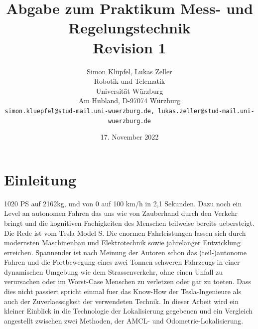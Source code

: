 \documentclass[11pt,a4paper]{article}
\begin{document}
\noindent

\title{\Large \bf Abgabe zum Praktikum Mess- und Regelungstechnik \\ \textbf{Revision 1}}

\author{Simon Klüpfel, Lukas Zeller\\
  Robotik und Telematik \\
  Universität Würzburg\\
  Am Hubland, D-97074 Würzburg\\
{\small \texttt{simon.kluepfel@stud-mail.uni-wuerzburg.de, lukas.zeller@stud-mail.uni-wuerzburg.de}}
}
\date{17. November 2022}

\maketitle

\section{Einleitung}
1020 PS auf 2162kg, und von 0 auf 100 km/h in 2,1 Sekunden\cite{website:tesla}. Dazu noch ein Level an autonomen Fahren das uns wie von Zauberhand durch den Verkehr bringt
und die kognitiven Faehigkeiten des Menschen teilweise bereits uebersteigt. Die Rede ist vom Tesla Model S. Die enormen Fahrleistungen lassen sich durch modernsten Maschinenbau und Elektrotechnik 
sowie jahrelanger Entwicklung erreichen. Spannender ist nach Meinung der Autoren schon das (teil-)autonome Fahren und die Fortbewegung eines 
zwei Tonnen schweren Fahrzeugs in einer dynamischen Umgebung wie dem Strassenverkehr, ohne einen Unfall zu verursachen oder im Worst-Case Menschen zu verletzen oder gar zu toeten.
Dass dies nicht passiert spricht einmal fuer das Know-How der Tesla-Ingenieure als auch der Zuverlaessigkeit der verwendeten Technik. In dieser Arbeit wird 
ein kleiner Einblick in die Technologie der Lokalisierung gegebenen und ein Vergleich angestellt zwischen zwei Methoden, der AMCL- und Odometrie-Lokalisierung.
\end{document}
